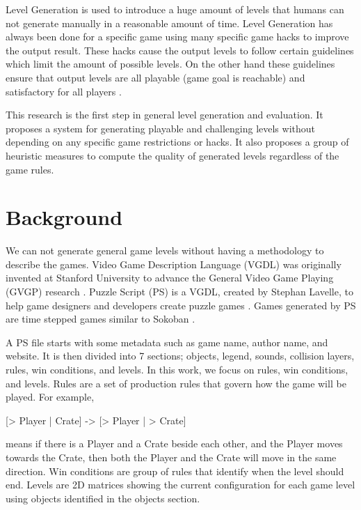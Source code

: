 \documentclass[letterpaper]{article}
\begin{document}
Level Generation is used to introduce a huge amount of levels that humans can not generate manually in a reasonable amount of time. Level Generation has always been done for a specific game using many specific game hacks to improve the output result. These hacks cause the output levels to follow certain guidelines which limit the amount of possible levels. On the other hand these guidelines ensure that output levels are all playable (game goal is reachable) and satisfactory for all players \citeauthor{mcGenerateEverything}.\\\par

This research is the first step in general level generation and evaluation. It proposes a system for generating playable and challenging levels without depending on any specific game restrictions or hacks. It also proposes a group of heuristic measures to compute the quality of generated levels regardless of the game rules.

\section{Background}
We can not generate general game levels without having a methodology to describe the games. Video Game Description Language (VGDL) was originally invented at Stanford University to advance the General Video Game Playing (GVGP) research \citeauthor{gvgp}. Puzzle Script (PS) is a VGDL, created by Stephan Lavelle, to help game designers and developers create puzzle games \citeauthor{puzzleScript}. Games generated by PS are time stepped games similar to Sokoban \citeauthor{sokoban}.\\\par

A PS file starts with some metadata such as game name, author name, and website. It is then divided into 7 sections; objects, legend, sounds, collision layers, rules, win conditions, and levels. In this work, we focus on rules, win conditions, and levels. Rules are a set of production rules that govern how the game will be played. For example, \begin{center}[> Player | Crate] -> [> Player | > Crate]\end{center} means if there is a Player and a Crate beside each other, and the Player moves towards the Crate, then both the Player and the Crate will move in the same direction. Win conditions are group of rules that identify when the level should end. Levels are 2D matrices showing the current configuration for each game level using objects identified in the objects section.
\end{document}
